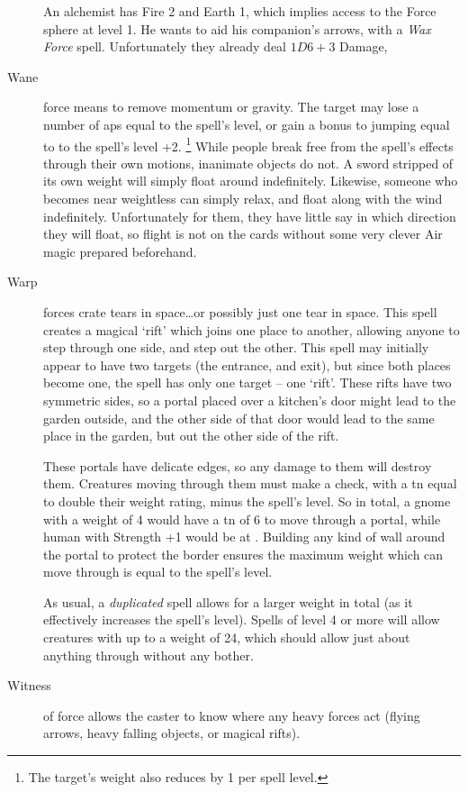 \begin{multicols}{2}
\begin{description}
  \begin{exampletext}
    An alchemist has Fire 2 and Earth 1, which implies access to the Force sphere at level 1.
    He wants to aid his companion's arrows, with a \textit{Wax Force} spell.
    Unfortunately they already deal $1D6+3$ Damage, 
  \end{exampletext}
  \item[Wane]
  force means to remove momentum or gravity.
  The target may lose a number of \glspl{ap} equal to the spell's level, or gain a bonus to jumping equal to to the spell's level +2.%
  \footnote{The target's \gls{weight} also reduces by 1 per spell level.}
  While people break free from the spell's effects through their own motions, inanimate objects do not.
  A sword stripped of its own weight will simply float around indefinitely.
  Likewise, someone who becomes near weightless can simply relax, and float along with the wind indefinitely.
  Unfortunately for them, they have little say in which direction they will float, so flight is not on the cards without some very clever Air magic prepared beforehand.
  \item[Warp]
  forces crate tears in space\ldots or possibly just one tear in space.
  This spell creates a magical `rift' which joins one place to another, allowing anyone to step through one side, and step out the other.
  This spell may initially appear to have two targets (the entrance, and exit), but since both places become one, the spell has only one target -- one `rift'.
  These rifts have two symmetric sides, so a portal placed over a kitchen's door might lead to the garden outside, and the other side of that door would lead to the same place in the garden, but out the other side of the rift.

  These portals have delicate edges, so any damage to them will destroy them.
  Creatures moving through them must make a  check, with a \gls{tn} equal to double their \gls{weight} rating, minus the spell's level.
  So in total, a gnome with a \gls{weight} of 4 would have a \gls{tn} of 6 to move through a portal, while human with Strength +1 would be at \tn[12].
  Building any kind of wall around the portal to protect the border ensures the maximum \gls{weight} which can move through is equal to the spell's level.

  As usual, a \textit{duplicated} spell allows for a larger \gls{weight} in total (as it effectively increases the spell's level).
  Spells of level 4 or more will allow creatures with up to a \gls{weight} of 24, which should allow just about anything through without any bother.
  \item[Witness]
  of force allows the caster to know where any heavy forces act (flying arrows, heavy falling objects, or magical rifts).
\end{description}

\end{multicols}

